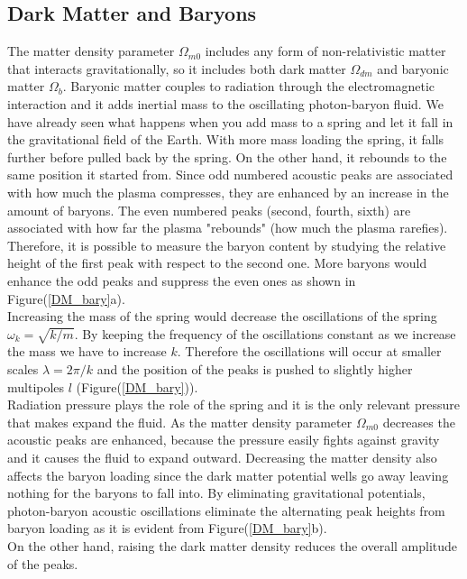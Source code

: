 \documentclass{article}
\begin{document}
\subsection{Dark Matter and Baryons}
The matter density parameter $\Omega_{m0}$ includes any form of non-relativistic matter that interacts gravitationally, so it includes both dark matter $\Omega_{dm}$ and baryonic matter $\Omega_{b}$.
Baryonic matter couples to radiation through the electromagnetic interaction and it adds inertial mass to the oscillating photon-baryon fluid.
We have already seen what happens when you add mass to a spring and let it fall in the gravitational field of the Earth.  
With more mass loading the spring, it falls further before pulled back by the spring. 
On the other hand, it rebounds to the same position it started from. 
Since odd numbered acoustic peaks are associated with how much the plasma compresses, they are enhanced by an increase in the amount of baryons.
The even numbered peaks (second, fourth, sixth) are associated with how far the plasma "rebounds" (how much the plasma rarefies).
Therefore, it is possible to measure the baryon content by studying the relative height of the first peak with respect to the second one.
More baryons would enhance the odd peaks and suppress the even ones as shown in Figure(\ref{DM_bary}a).\\
Increasing the mass of the spring would decrease the oscillations of the spring $\omega_k = \sqrt{k/m}$.
By keeping the frequency of the oscillations constant as we increase the mass we have to increase $k$.
Therefore the oscillations will occur at smaller scales $\lambda =2 \pi /k$ and the position of the peaks is pushed to slightly higher multipoles $l$ (Figure(\ref{DM_bary})).\\
Radiation pressure plays the role of the spring and it is the only relevant pressure that makes expand the fluid.
As the matter density parameter $\Omega_{m0}$ decreases the acoustic peaks are enhanced, because the pressure easily fights against gravity and it causes the fluid to expand outward.
Decreasing the matter density also affects the baryon loading since the dark matter potential wells go away leaving nothing for the baryons to fall into.
By eliminating gravitational potentials, photon-baryon acoustic oscillations eliminate the alternating peak heights from baryon loading \cite{huCosmicMicrowaveBackground2001} as it is evident from Figure(\ref{DM_bary}b).\\
On the other hand, raising the dark matter density reduces the overall amplitude of the peaks.
\end{document}

